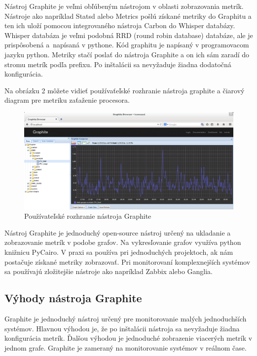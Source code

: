 \documentclass[a4paper, upjsfrontpage, thesismargins, thesislinespacing]{rnthesis}
\begin{document}
Nástroj Graphite je veľmi obľúbeným nástrojom v oblasti zobrazovania metrík.
Nástroje ako napríklad Statsd alebo Metrics pošlú získané metriky do Graphitu a ten ich uloží pomocou integrovaného nástroja Carbon do Whisper databázy. 
Whisper databáza je veľmi podobná RRD (round robin database) databáze, ale je prispôsobená a~napísaná v pythone.
Kód graphitu je napísaný v programovacom jazyku python.
Metriky stačí poslať do nástroja Graphite a on ich sám zaradí do stromu metrík podľa prefixu.
Po inštalácii sa nevyžaduje žiadna dodatočná konfigurácia.

Na obrázku 2 môžete vidieť používaťeľské rozhranie nástroja graphite a čiarový diagram pre metriku zaťaženie procesora.

\begin{figure}
\begin{center}
\includegraphics[scale=0.41]{graphite1.png}
\caption{Používateľské rozhranie nástroja Graphite}
\end{center}
\end{figure}

Nástroj Graphite je jednoduchý open-source nástroj určený na ukladanie a zobrazovanie metrík v podobe grafov.
Na vykresľovanie grafov využíva python knižnicu PyCairo.
V praxi sa používa pri jednoduchých projektoch, ak nám postačuje získané metriky zobrazovať.
Pri monitorovaní komplexnejších systémov sa používajú zložitejšie nástroje ako napríklad Zabbix alebo Ganglia.

\subsection{Výhody nástroja Graphite}

Graphite je jednoduchý nástroj určený pre monitorovanie malých jednoduchších systémov.
Hlavnou výhodou je, že po inštalácii nástroja sa nevyžaduje žiadna konfigurácia metrík.
Ďalšou výhodou je jednoduché zobrazenie viacerých metrík v jednom grafe.
Graphite je zameraný na monitorovanie systémov v reálnom čase.
\end{document}
